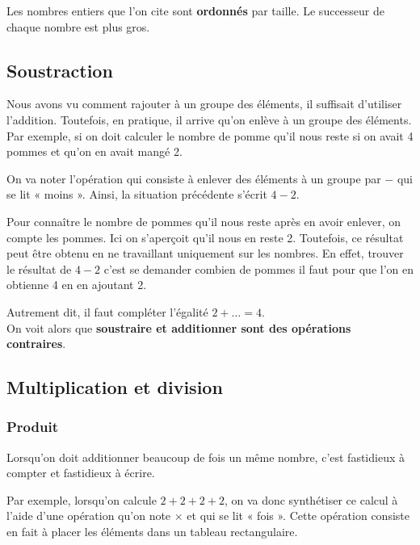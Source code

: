 Les nombres entiers que l'on cite sont \textbf{ordonnés} par taille. Le successeur de chaque nombre est plus gros.

\subsection{Soustraction}
Nous avons vu comment rajouter à un groupe des éléments, il suffisait d'utiliser l'addition. Toutefois, en pratique, il arrive qu'on enlève à un groupe des éléments. Par exemple, si on doit calculer le nombre de pomme qu'il nous reste si on avait 4 pommes et qu'on en avait mangé 2. 

On va noter l'opération qui consiste à enlever des éléments à un groupe par $-$ qui se lit « moins ». Ainsi, la situation précédente s'écrit $4 - 2$.

Pour connaître le nombre de pommes qu'il nous reste après en avoir enlever, on compte les pommes. Ici on s'aperçoit qu'il nous en reste 2. Toutefois, ce résultat peut être obtenu en ne travaillant uniquement sur les nombres. En effet, trouver le résultat de $4-2$ c'est se demander combien de pommes il faut pour que l'on en obtienne 4 en en ajoutant 2. 

Autrement dit, il faut compléter l'égalité $2 + \ldots = 4$.\\
On voit alors que \textbf{soustraire et additionner sont des opérations contraires}.

\subsection{Multiplication et division}
\subsubsection{Produit}
Lorsqu'on doit additionner beaucoup de fois un même nombre, c'est fastidieux à compter et fastidieux à écrire.

Par exemple, lorsqu'on calcule $2 + 2 + 2 + 2$, on va donc synthétiser ce calcul à l'aide d'une opération qu'on note $\times$ et qui se lit « fois ». Cette opération consiste en fait à placer les éléments dans un tableau rectangulaire.

